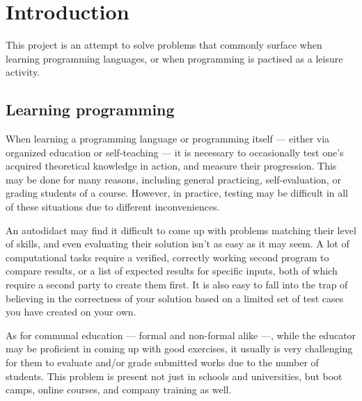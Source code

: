 


%

\chapter{Introduction}\label{sect:Intro}

	This project is an attempt to solve problems that commonly surface when learning programming languages, or when programming is pactised as a leisure activity.

	\section{Learning programming}
	
	When learning a programming language or programming itself --- either via organized education or self-teaching --- it is necessary to occasionally test one's acquired theoretical knowledge in action, and measure their progression. This may be done for many reasons, including general practicing, self-evaluation, or grading students of a course. However, in practice, testing may be difficult in all of these situations due to different inconveniences.
	
	An autodidact may find it difficult to come up with problems matching their level of skills, and even evaluating their solution isn't as easy as it may seem. A lot of computational tasks require a verified, correctly working second program to compare results, or a list of expected results for specific inputs, both of which require a second party to create them first. It is also easy to fall into the trap of believing in the correctness of your solution based on a limited set of test cases you have created on your own.
	
	As for communal education --- formal and non-formal alike ---, while the educator may be proficient in coming up with good exercises, it usually is very challenging for them to evaluate and/or grade submitted works due to the number of students. This problem is present not just in schools and universities, but boot camps, online courses, and company training as well.
	

